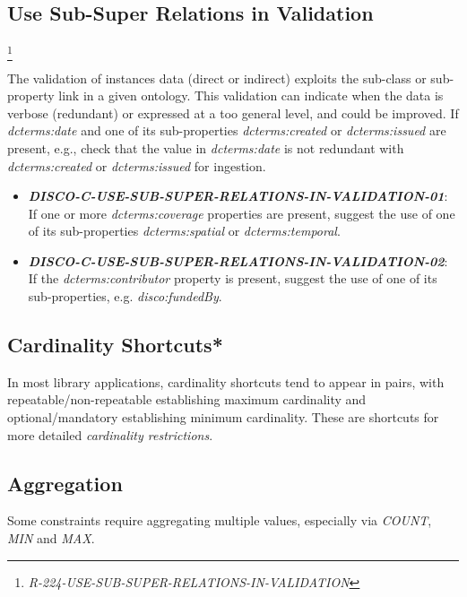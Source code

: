 \documentclass{llncs}
\begin{document}
\subsection{Use Sub-Super Relations in Validation}

\footnote{\emph{R-224-USE-SUB-SUPER-RELATIONS-IN-VALIDATION}}

The validation of instances data (direct or indirect) exploits the sub-class or sub-property link in a given ontology.
This validation can indicate when the data is verbose (redundant) or expressed at a too general level, and could be improved.
If \emph{dcterms:date} and one of its sub-properties \emph{dcterms:created} or \emph{dcterms:issued} are present, e.g., check that the value in \emph{dcterms:date} is not redundant with \emph{dcterms:created} or \emph{dcterms:issued} for ingestion.

\begin{itemize}
	\item \textbf{{\em DISCO-C-USE-SUB-SUPER-RELATIONS-IN-VALIDATION-01}}: 
	If one or more \emph{dcterms:coverage} properties are present, suggest the use of one of its sub-properties \emph{dcterms:spatial} or \emph{dcterms:temporal}.
	\item \textbf{{\em DISCO-C-USE-SUB-SUPER-RELATIONS-IN-VALIDATION-02}}: 
	If the \emph{dcterms:contributor} property is present, suggest the use of one of its sub-properties, e.g. \emph{disco:fundedBy}.
\end{itemize}

\subsection{Cardinality Shortcuts*}

In most library applications, cardinality shortcuts tend to appear in pairs, with repeatable/non-repeatable establishing maximum cardinality and optional/mandatory establishing minimum cardinality.
These are shortcuts for more detailed \emph{cardinality restrictions}.

\subsection{Aggregation}

Some constraints require aggregating multiple values, especially via \emph{COUNT}, \emph{MIN} and \emph{MAX}.
\end{document}
